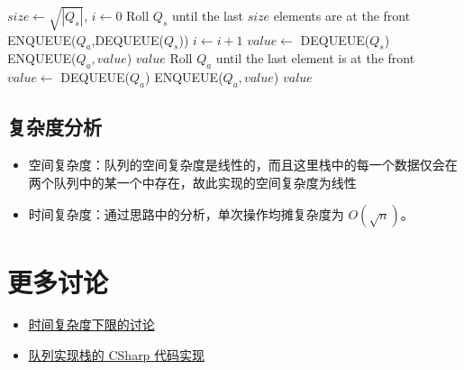 \documentclass{tufte-handout}
\begin{document}
\begin{CJK*}{UTF8}{gbsn}
\begin{algorithm}[t]
\begin{algorithmic}[1]
    \State $size \gets \sqrt{|Q_s|}$, $i \gets 0$
    \State Roll $Q_s$ until the last $size$ elements are at the front
    \State ENQUEUE($Q_a$,DEQUEUE($Q_s$))
    \State $i \gets i+1$
    \EndWhile
    \State $value \gets$ DEQUEUE($Q_s$)
    \State ENQUEUE($Q_a,value$)
    \Return $value$
    \Else
    \State Roll $Q_a$ until the last element is at the front
    \State $value \gets$ DEQUEUE($Q_a$)
    \State ENQUEUE($Q_a,value$)
    \Return $value$
    \EndIf
    \hStatex
    \EndProcedure
\end{algorithmic}
\end{algorithm}

\subsection{复杂度分析}
\begin{itemize}
    \item 空间复杂度：队列的空间复杂度是线性的，而且这里栈中的每一个数据仅会在两个队列中的某一个中存在，故此实现的空间复杂度为线性
    \item 时间复杂度：通过思路中的分析，单次操作均摊复杂度为 $O(\sqrt{n})$。
\end{itemize}

\section{更多讨论}
\begin{itemize}
    \item \href{https://cstheory.stackexchange.com/questions/2562/one-stack-two-queues/5655#5655}{时间复杂度下限的讨论}
    \item \href{https://cstheory.stackexchange.com/questions/2562/one-stack-two-queues/2589#2589}{队列实现栈的 CSharp 代码实现}
\end{itemize}




\end{CJK*}
\end{document}
